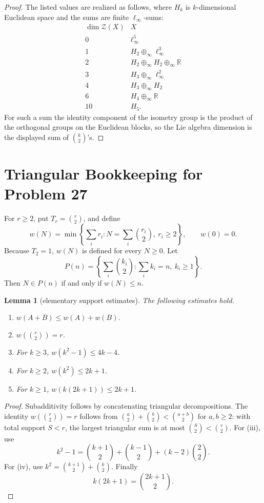 \documentclass[11pt]{article}
\newtheorem{lemma}[theorem]{Lemma}
\theoremstyle{remark}
\newcommand{\R}{\mathbb R}
\begin{document}
\begin{proof}
The listed values are realized as follows, where \(H_k\) is \(k\)-dimensional
Euclidean space and the sums are finite \(\ell_\infty\)-sums:
\[
\begin{array}{c|c}
\dim\mathcal Z(X) & X\\ \hline
0 & \ell_\infty^5\\
1 & H_2\oplus_\infty \ell_\infty^3\\
2 & H_2\oplus_\infty H_2\oplus_\infty\R\\
3 & H_3\oplus_\infty \ell_\infty^2\\
4 & H_3\oplus_\infty H_2\\
6 & H_4\oplus_\infty \R\\
10 & H_5.
\end{array}
\]
For such a sum the identity component of the isometry group is the product
of the orthogonal groups on the Euclidean blocks, so the Lie algebra dimension
is the displayed sum of \(\binom{k}{2}\)'s.
\end{proof}

\section{Triangular Bookkeeping for Problem 27}

For \(r\geq 2\), put \(T_r=\binom r2\), and define
\[
 w(N)=\min\left\{\sum_i r_i:
       N=\sum_i \binom{r_i}{2},\ r_i\geq 2\right\},
 \qquad w(0)=0.
\]
Because \(T_2=1\), \(w(N)\) is defined for every \(N\geq0\).  Let
\[
 P(n)=
 \left\{\sum_i \binom{k_i}{2}:\sum_i k_i=n,\ k_i\geq1\right\}.
\]
Then \(N\in P(n)\) if and only if \(w(N)\leq n\).

\begin{lemma}[elementary support estimates]\label{lem:w-estimates}
The following estimates hold.
\begin{enumerate}[label=\textup{(\roman*)}]
\item \(w(A+B)\leq w(A)+w(B)\).
\item \(w(\binom r2)=r\).
\item For \(k\geq3\), \(w(k^2-1)\leq4k-4\).
\item For \(k\geq2\), \(w(k^2)\leq2k+1\).
\item For \(k\geq1\), \(w(k(2k+1))\leq2k+1\).
\end{enumerate}
\end{lemma}

\begin{proof}
Subadditivity follows by concatenating triangular decompositions.  The
identity \(w(\binom r2)=r\) follows from
\(\binom a2+\binom b2<\binom{a+b}2\) for \(a,b\geq2\): with total support
\(S<r\), the largest triangular sum is at most \(\binom S2<\binom r2\).
For (iii), use
\[
 k^2-1=\binom{k+1}{2}+\binom{k-1}{2}+(k-2)\binom22.
\]
For (iv), use \(k^2=\binom{k+1}{2}+\binom k2\).  Finally
\[
 k(2k+1)=\binom{2k+1}{2}.
\]
\end{proof}
\end{document}

